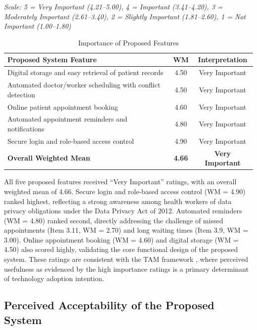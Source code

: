 \documentclass{research}
\begin{document}
\begin{table}[H]
\centering
\label{tab:proposed_features}
\renewcommand{\arraystretch}{1.1}
\footnotesize\textit{Scale: 5 = Very Important (4.21--5.00), 4 = Important (3.41--4.20), 3 = Moderately Important (2.61--3.40), 2 = Slightly Important (1.81--2.60), 1 = Not Important (1.00--1.80)}
\begin{tabular}{>{\raggedright\arraybackslash}p{9cm} c c}
\toprule
\textbf{Proposed System Feature} & \textbf{WM} & \textbf{Interpretation} \\
\midrule
4.1 Digital storage and easy retrieval of patient records           & 4.50 & Very Important \\
4.2 Automated doctor/worker scheduling with conflict detection      & 4.50 & Very Important \\
4.3 Online patient appointment booking                              & 4.60 & Very Important \\
4.4 Automated appointment reminders and notifications               & 4.80 & Very Important \\
4.5 Secure login and role-based access control                      & 4.90 & Very Important \\
\midrule
\textbf{Overall Weighted Mean}                                      & \textbf{4.66} & \textbf{Very Important} \\
\bottomrule
\end{tabular}

\vspace{4pt}
\caption {Importance of Proposed Features}
\end{table}

All five proposed features received ``Very Important'' ratings, with an overall weighted mean of 4.66. Secure login and role-based access control (WM = 4.90) ranked highest, reflecting a strong awareness among health workers of data privacy obligations under the Data Privacy Act of 2012. Automated reminders (WM = 4.80) ranked second, directly addressing the challenge of missed appointments (Item 3.11, WM = 2.70) and long waiting times (Item 3.9, WM = 3.00). Online appointment booking (WM = 4.60) and digital storage (WM = 4.50) also scored highly, validating the core functional design of the proposed system. These ratings are consistent with the TAM framework \cite{ref56}, where perceived usefulness as evidenced by the high importance ratings is a primary determinant of technology adoption intention.

\subsection{Perceived Acceptability of the Proposed System }
\end{document}
